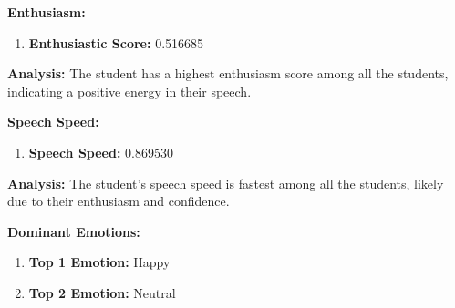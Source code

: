 \documentclass{article}
\begin{document}
\large{\textbf{Enthusiasm:}}
\begin{tcolorbox}[colback=orange!10!white, colframe=orange!80!black, title=Enthusiastic Score]
    \begin{enumerate}
        \item \textbf{Enthusiastic Score:} \textcolor{orange!70!black}{0.516685}
    \end{enumerate}
\end{tcolorbox}
    \textbf{Analysis:} The student has a highest enthusiasm score among all the students, indicating a positive energy in their speech.

\large{\textbf{Speech Speed:}}
\begin{tcolorbox}[colback=purple!10!white, colframe=purple!80!black, title=Speech Speed]
    \begin{enumerate}
        \item \textbf{Speech Speed:} \textcolor{purple!70!black}{0.869530}
    \end{enumerate}
\end{tcolorbox}
    \textbf{Analysis:} The student's speech speed is fastest among all the students, likely due to their enthusiasm and confidence.

\large{\textbf{Dominant Emotions:}}
\begin{tcolorbox}[colback=pink!10!white, colframe=pink!80!black, title=Emotional State]
    \begin{enumerate}
        \item \textbf{Top 1 Emotion:} \textcolor{blue!80!black}{Happy}
        \item \textbf{Top 2 Emotion:} \textcolor{red!80!black}{Neutral}
    \end{enumerate}
\end{tcolorbox}
\end{document}

